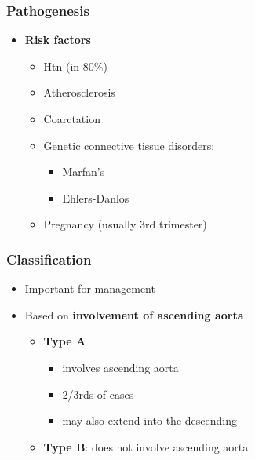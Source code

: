 \documentclass[
  12pt,
]{memoir}
\providecommand{\tightlist}{%
  \setlength{\itemsep}{0pt}\setlength{\parskip}{0pt}}
\begin{document}
\hypertarget{pathogenesis-3}{%
\subsubsection{Pathogenesis}\label{pathogenesis-3}}

\begin{itemize}
\tightlist
\item
  \textbf{Risk factors}

  \begin{itemize}
  \tightlist
  \item
    Htn (in 80\%)
  \item
    Atherosclerosis
  \item
    Coarctation
  \item
    Genetic connective tissue disorders:

    \begin{itemize}
    \tightlist
    \item
      Marfan's
    \item
      Ehlers-Danlos
    \end{itemize}
  \item
    Pregnancy (usually 3rd trimester)
  \end{itemize}
\end{itemize}

\hypertarget{classification-1}{%
\subsubsection{Classification}\label{classification-1}}

\begin{itemize}
\tightlist
\item
  Important for management
\item
  Based on \textbf{involvement of ascending aorta}

  \begin{itemize}
  \tightlist
  \item
    \textbf{Type A}

    \begin{itemize}
    \tightlist
    \item
      involves ascending aorta
    \item
      2/3rds of cases
    \item
      may also extend into the descending
    \end{itemize}
  \item
    \textbf{Type B}: does not involve ascending aorta
  \end{itemize}
\end{itemize}
\end{document}
